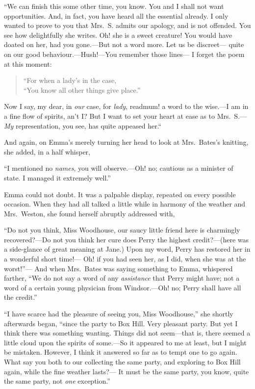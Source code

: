 ``We can finish this some other time, you know.  You and I shall
not want opportunities.  And, in fact, you have heard all the
essential already.  I only wanted to prove to you that Mrs.\ S. admits
our apology, and is not offended.  You see how delightfully
she writes.  Oh! she is a sweet creature!  You would have doated
on her, had you gone.---But not a word more.  Let us be discreet---%
quite on our good behaviour.---Hush!---You remember those lines---%
I forget the poem at this moment:

\begin{verse}
        ``For when a lady's in the case,\\
        ``You know all other things give place.''
\end{verse}

Now I say, my dear, in \emph{our} case, for \emph{lady}, read\gdash{}mum! a word
to the wise.---I am in a fine flow of spirits, an't I?  But I want
to set your heart at ease as to Mrs.\ S.---\emph{My} representation, you see,
has quite appeased her.``

And again, on Emma's merely turning her head to look
at Mrs.\ Bates's knitting, she added, in a half whisper,

``I mentioned no \emph{names}, you will observe.---Oh! no; cautious as
a minister of state.  I managed it extremely well.''

Emma could not doubt.  It was a palpable display, repeated on every
possible occasion.  When they had all talked a little while in harmony
of the weather and Mrs.\ Weston, she found herself abruptly addressed with,

``Do not you think, Miss Woodhouse, our saucy little friend here is
charmingly recovered?---Do not you think her cure does Perry the
highest credit?---(here was a side-glance of great meaning at Jane.)
Upon my word, Perry has restored her in a wonderful short time!---%
Oh! if you had seen her, as I did, when she was at the worst!''---%
And when Mrs.\ Bates was saying something to Emma, whispered farther,
``We do not say a word of any \emph{assistance} that Perry might have;
not a word of a certain young physician from Windsor.---Oh! no;
Perry shall have all the credit.''

``I have scarce had the pleasure of seeing you, Miss Woodhouse,''
she shortly afterwards began, ``since the party to Box Hill.
Very pleasant party.  But yet I think there was something wanting.
Things did not seem---that is, there seemed a little cloud upon
the spirits of some.---So it appeared to me at least, but I might
be mistaken.  However, I think it answered so far as to tempt one
to go again.  What say you both to our collecting the same party,
and exploring to Box Hill again, while the fine weather lasts?---%
It must be the same party, you know, quite the same party,
not \emph{one} exception.''

